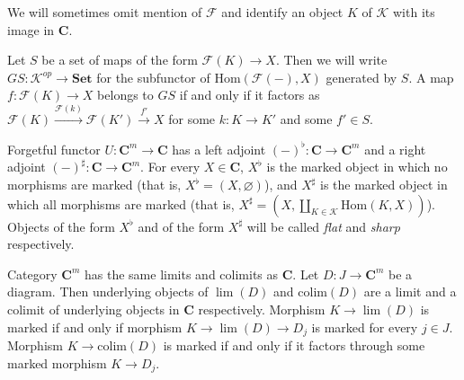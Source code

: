 \documentclass[reqno]{amsart}
\theoremstyle{definition}
\theoremstyle{remark}
\newcommand{\cat}[1]{\mathbf{#1}}
\newcommand{\C}{\cat{C}}
\newcommand{\Set}{\cat{Set}}
\newcommand{\Hom}{\mathrm{Hom}}
\newcommand{\colim}{\mathrm{colim}}
\numberwithin{figure}{section}
\begin{document}
We will sometimes omit mention of $\mathcal{F}$ and identify an object $K$ of $\mathcal{K}$ with its image in $\C$.

Let $S$ be a set of maps of the form $\mathcal{F}(K) \to X$.
Then we will write $GS : \mathcal{K}^{op} \to \Set$ for the subfunctor of $\Hom(\mathcal{F}(-),X)$ generated by $S$.
A map $f : \mathcal{F}(K) \to X$ belongs to $GS$ if and only if it factors as $\mathcal{F}(K) \xrightarrow{\mathcal{F}(k)} \mathcal{F}(K') \xrightarrow{f'} X$
for some $k : K \to K'$ and some $f' \in S$.

Forgetful functor $U : \C^m \to \C$ has a left adjoint $(-)^\flat : \C \to \C^m$ and a right adjoint $(-)^\sharp : \C \to \C^m$.
For every $X \in \C$, $X^\flat$ is the marked object in which no morphisms are marked (that is, $X^\flat = (X,\varnothing)$),
and $X^\sharp$ is the marked object in which all morphisms are marked (that is, $X^\sharp = (X,\coprod_{K \in \mathcal{K}} \Hom(K,X))$).
Objects of the form $X^\flat$ and of the form $X^\sharp$ will be called \emph{flat} and \emph{sharp} respectively.

Category $\C^m$ has the same limits and colimits as $\C$.
Let $D : J \to \C^m$ be a diagram.
Then underlying objects of $\lim(D)$ and $\colim(D)$ are a limit and a colimit of underlying objects in $\C$ respectively.
Morphism $K \to \lim(D)$ is marked if and only if morphism $K \to \lim(D) \to D_j$ is marked for every $j \in J$.
Morphism $K \to \colim(D)$ is marked if and only if it factors through some marked morphism $K \to D_j$.
\end{document}
